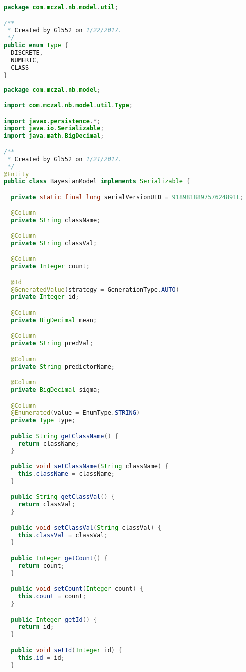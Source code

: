 \begin{lstlisting}[language=Java,basicstyle=\tiny,caption=Type.java]
package com.mczal.nb.model.util;

/**
 * Created by Gl552 on 1/22/2017.
 */
public enum Type {
  DISCRETE,
  NUMERIC,
  CLASS
}

\end{lstlisting}

\begin{lstlisting}[language=Java,basicstyle=\tiny,caption=BayesianModel.java]
package com.mczal.nb.model;

import com.mczal.nb.model.util.Type;

import javax.persistence.*;
import java.io.Serializable;
import java.math.BigDecimal;

/**
 * Created by Gl552 on 1/21/2017.
 */
@Entity
public class BayesianModel implements Serializable {

  private static final long serialVersionUID = 918981889757624891L;

  @Column
  private String className;

  @Column
  private String classVal;

  @Column
  private Integer count;

  @Id
  @GeneratedValue(strategy = GenerationType.AUTO)
  private Integer id;

  @Column
  private BigDecimal mean;

  @Column
  private String predVal;

  @Column
  private String predictorName;

  @Column
  private BigDecimal sigma;

  @Column
  @Enumerated(value = EnumType.STRING)
  private Type type;

  public String getClassName() {
    return className;
  }

  public void setClassName(String className) {
    this.className = className;
  }

  public String getClassVal() {
    return classVal;
  }

  public void setClassVal(String classVal) {
    this.classVal = classVal;
  }

  public Integer getCount() {
    return count;
  }

  public void setCount(Integer count) {
    this.count = count;
  }

  public Integer getId() {
    return id;
  }

  public void setId(Integer id) {
    this.id = id;
  }


\end{lstlisting}
